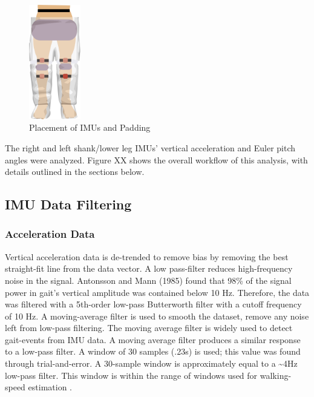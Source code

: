 \documentclass[defaultstyle,11pt]{comps}
\begin{document}
\begin{figure}
\hypertarget{fig:SA1-Loc}{%
\centering
\includegraphics[width=0.2\textwidth,height=\textheight]{../fig/SA1/IMUPlacement.png}
\caption{Placement of IMUs and Padding}\label{fig:SA1-Loc}
}
\end{figure}

The right and left shank/lower leg IMUs' vertical acceleration and Euler pitch angles were analyzed.
Figure XX shows the overall workflow of this analysis, with details outlined in the sections below.

\hypertarget{imu-data-filtering}{%
\subsection{IMU Data Filtering}\label{imu-data-filtering}}

\hypertarget{acceleration-data}{%
\subsubsection{Acceleration Data}\label{acceleration-data}}

Vertical acceleration data is de-trended to remove bias by removing the best straight-fit line from the data vector.
A low pass-filter reduces high-frequency noise in the signal.
Antonsson and Mann (1985)\citep{Antonsson1985} found that 98\% of the signal power in gait's vertical amplitude was contained below 10 Hz.
Therefore, the data was filtered with a 5th-order low-pass Butterworth filter with a cutoff frequency of 10 Hz.
A moving-average filter is used to smooth the dataset, remove any noise left from low-pass filtering.
The moving average filter is widely used to detect gait-events from IMU data\citep{Han2019}.
A moving average filter produces a similar response to a low-pass filter.
A window of 30 samples (.23s) is used; this value was found through trial-and-error.
A 30-sample window is approximately equal to a \textasciitilde4Hz low-pass filter.
This window is within the range of windows used for walking-speed estimation \citep{Byun2019}.
\end{document}
